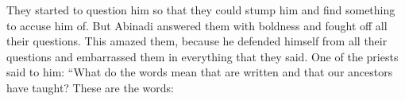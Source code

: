 \bverse \iffalse And they began to question him, that they might cross him, that thereby they might have wherewith to accuse him; but he answered them boldly, and withstood all their questions, yea, to their astonishment; for he did withstand them in all their questions, and did confound them in all their words. \fi
They started to question him so that they could stump him and find something to accuse him of. But Abinadi answered them with boldness and fought off all their questions. This amazed them, because he defended himself from all their questions and embarrassed them in everything that they said.
\bverse \iffalse And it came to pass that one of them said unto him: What meaneth the words which are written, and which have been taught by our fathers, saying: \fi
One of the priests said to him: ``What do the words mean that are written and that our ancestors have taught? These are the words:

